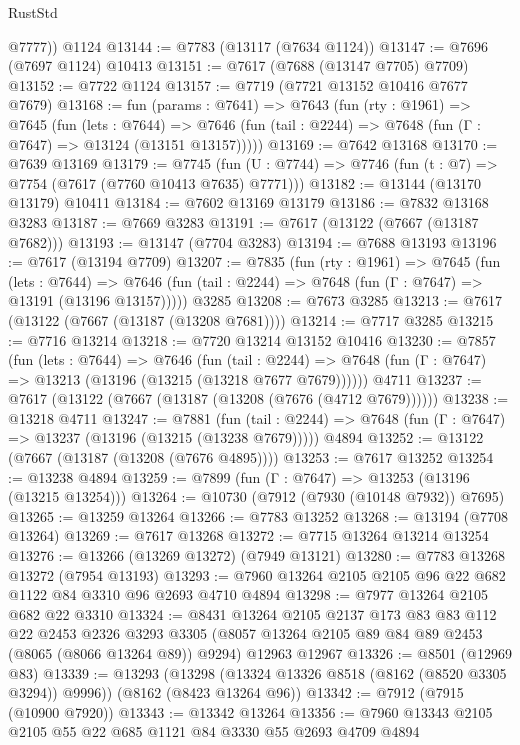 \begin{lexlean}{RustStd}
\begin{coremodule}
        @7777))
    @1124
@13144 := @7783 (@13117 (@7634 @1124))
@13147 := @7696 (@7697 @1124) @10413
@13151 := @7617 (@7688 (@13147 @7705) @7709)
@13152 := @7722 @1124
@13157 := @7719 (@7721 @13152 @10416 @7677 @7679)
@13168 := fun (params : @7641) =>
  @7643
    (fun (rty : @1961) =>
    @7645
      (fun (lets : @7644) =>
      @7646 (fun (tail : @2244) => @7648 (fun (Γ : @7647) => @13124 (@13151 @13157)))))
@13169 := @7642 @13168
@13170 := @7639 @13169
@13179 := @7745
    (fun (U : @7744) => @7746 (fun (t : @7) => @7754 (@7617 (@7760 @10413 @7635) @7771)))
@13182 := @13144 (@13170 @13179) @10411
@13184 := @7602 @13169 @13179
@13186 := @7832 @13168 @3283
@13187 := @7669 @3283
@13191 := @7617 (@13122 (@7667 (@13187 @7682)))
@13193 := @13147 (@7704 @3283)
@13194 := @7688 @13193
@13196 := @7617 (@13194 @7709)
@13207 := @7835
    (fun (rty : @1961) =>
    @7645
      (fun (lets : @7644) =>
      @7646 (fun (tail : @2244) => @7648 (fun (Γ : @7647) => @13191 (@13196 @13157)))))
    @3285
@13208 := @7673 @3285
@13213 := @7617 (@13122 (@7667 (@13187 (@13208 @7681))))
@13214 := @7717 @3285
@13215 := @7716 @13214
@13218 := @7720 @13214 @13152 @10416
@13230 := @7857
    (fun (lets : @7644) =>
    @7646
      (fun (tail : @2244) =>
      @7648 (fun (Γ : @7647) => @13213 (@13196 (@13215 (@13218 @7677 @7679))))))
    @4711
@13237 := @7617 (@13122 (@7667 (@13187 (@13208 (@7676 (@4712 @7679))))))
@13238 := @13218 @4711
@13247 := @7881
    (fun (tail : @2244) => @7648 (fun (Γ : @7647) => @13237 (@13196 (@13215 (@13238 @7679)))))
    @4894
@13252 := @13122 (@7667 (@13187 (@13208 (@7676 @4895))))
@13253 := @7617 @13252
@13254 := @13238 @4894
@13259 := @7899 (fun (Γ : @7647) => @13253 (@13196 (@13215 @13254)))
@13264 := @10730 (@7912 (@7930 (@10148 @7932)) @7695)
@13265 := @13259 @13264
@13266 := @7783 @13252
@13268 := @13194 (@7708 @13264)
@13269 := @7617 @13268
@13272 := @7715 @13264 @13214 @13254
@13276 := @13266 (@13269 @13272) (@7949 @13121)
@13280 := @7783 @13268 @13272 (@7954 @13193)
@13293 := @7960 @13264 @2105 @2105 @96 @22 @682 @1122 @84 @3310 @96 @2693 @4710 @4894
@13298 := @7977 @13264 @2105 @682 @22 @3310
@13324 := @8431
    @13264
    @2105
    @2137
    @173
    @83
    @83
    @112
    @22
    @2453
    @2326
    @3293
    @3305
    (@8057 @13264 @2105 @89 @84 @89 @2453 (@8065 (@8066 @13264 @89)) @9294)
    @12963
    @12967
@13326 := @8501 (@12969 @83)
@13339 := @13293
    (@13298 (@13324 @13326 @8518 (@8162 (@8520 @3305 @3294)) @9996))
    (@8162 (@8423 @13264 @96))
@13342 := @7912 (@7915 (@10900 @7920))
@13343 := @13342 @13264
@13356 := @7960 @13343 @2105 @2105 @55 @22 @685 @1121 @84 @3330 @55 @2693 @4709 @4894

\end{coremodule}
\end{lexlean}
